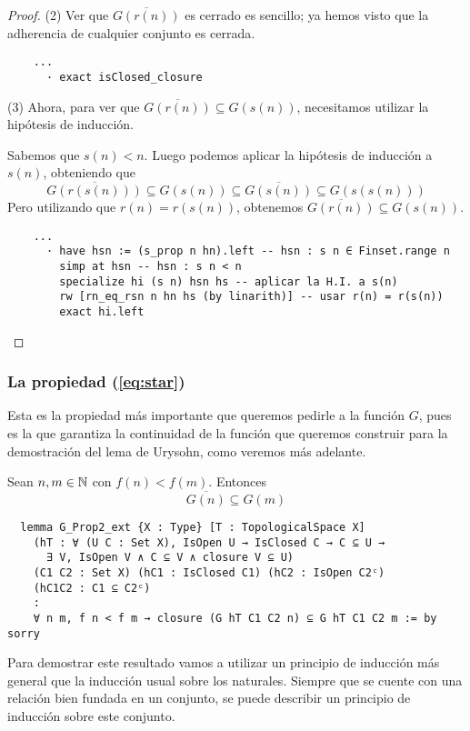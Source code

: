 \begin{proof}
  (2) Ver que $\overline{G(r(n))}$ es cerrado es sencillo; ya hemos visto que la adherencia de cualquier conjunto es cerrada.

  \begin{lstlisting}
    ...
      · exact isClosed_closure \end{lstlisting}

  (3) Ahora, para ver que $\overline{G(r(n))} \subseteq G(s(n))$, necesitamos utilizar la hipótesis de inducción.

  Sabemos que $s(n) < n$. Luego podemos aplicar la hipótesis de inducción a $s(n)$, obteniendo que
  $$
  \overline{G(r(s(n)))} \subseteq G(s(n)) \subseteq \overline{G(s(n))} \subseteq G(s(s(n)))
  $$
  Pero utilizando que $r(n) = r(s(n))$, obtenemos $\overline{G(r(n))} \subseteq G(s(n))$.

  \begin{lstlisting}
    ...
      · have hsn := (s_prop n hn).left -- hsn : s n ∈ Finset.range n
        simp at hsn -- hsn : s n < n
        specialize hi (s n) hsn hs -- aplicar la H.I. a s(n)
        rw [rn_eq_rsn n hn hs (by linarith)] -- usar r(n) = r(s(n))
        exact hi.left \end{lstlisting}
\end{proof}

\subsubsection{La propiedad (\ref{eq:star})}

Esta es la propiedad más importante que queremos pedirle a la función $G$, pues es la que garantiza la continuidad de la función que queremos construir para la demostración del lema de Urysohn, como veremos más adelante.

\begin{lemma}
  Sean $n, m \in \mathbb{N}$ con $f(n) < f(m)$. Entonces
  $$
  \overline{G(n)} \subseteq G(m)
  $$
\end{lemma}

\begin{lstlisting}
  lemma G_Prop2_ext {X : Type} [T : TopologicalSpace X]
    (hT : ∀ (U C : Set X), IsOpen U → IsClosed C → C ⊆ U →
      ∃ V, IsOpen V ∧ C ⊆ V ∧ closure V ⊆ U)
    (C1 C2 : Set X) (hC1 : IsClosed C1) (hC2 : IsOpen C2ᶜ)
    (hC1C2 : C1 ⊆ C2ᶜ)
    :
    ∀ n m, f n < f m → closure (G hT C1 C2 n) ⊆ G hT C1 C2 m := by sorry
\end{lstlisting}

Para demostrar este resultado vamos a utilizar un principio de inducción más general que la inducción usual sobre los naturales. Siempre que se cuente con una relación bien fundada en un conjunto, se puede describir un principio de inducción sobre este conjunto.

